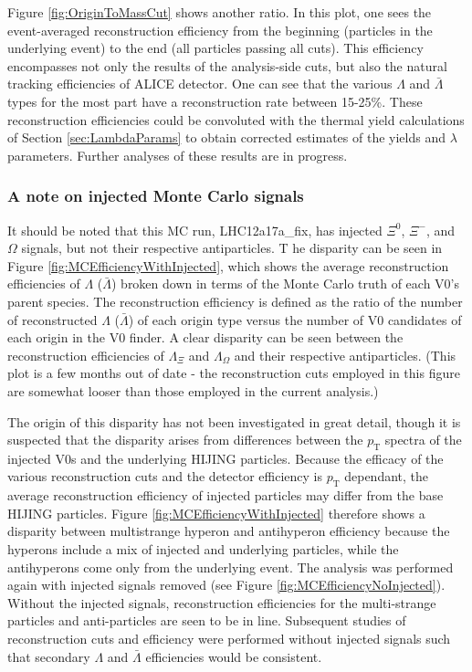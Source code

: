 Figure \ref{fig:OriginToMassCut} shows another ratio.  
In this plot, one sees the event-averaged reconstruction efficiency from the beginning (particles in the underlying event) to the end (all particles passing all cuts).  
This efficiency encompasses not only the results of the analysis-side cuts, but also the natural tracking efficiencies of ALICE detector.  
One can see that the various $\Lambda$ and $\bar{\Lambda}$ types for the most part have a reconstruction rate between 15-25\%.  
These reconstruction efficiencies could be convoluted with the thermal yield calculations of Section \ref{sec:LambdaParams} to obtain corrected estimates of the yields and $\lambda$ parameters.  
Further analyses of these results are in progress.

\subsubsection{A note on injected Monte Carlo signals}
\label{sec:InjectedMCSignals}

It should be noted that this MC run, LHC12a17a\_fix, has injected $\Xi^0$, $\Xi^-$, and $\Omega$ signals, but not their respective antiparticles.  T
he disparity can be seen in Figure \ref{fig:MCEfficiencyWithInjected}, which shows the average reconstruction efficiencies of $\Lambda$ ($\bar{\Lambda}$) broken down in terms of the Monte Carlo truth of each V0's parent species. 
The reconstruction efficiency is defined as the ratio of the number of reconstructed $\Lambda$ ($\bar{\Lambda}$) of each origin type versus the number of V0 candidates of each origin in the V0 finder.  
A clear disparity can be seen between the reconstruction efficiencies of $\Lambda_{\Xi}$ and $\Lambda_{\Omega}$ and their respective antiparticles.  
(This plot is a few months out of date - the reconstruction cuts employed in this figure are somewhat looser than those employed in the current analysis.)

The origin of this disparity has not been investigated in great detail, though it is suspected that the disparity arises from differences between the $p_\mathrm{T}$ spectra of the injected V0s and the underlying HIJING particles.  
Because the efficacy of the various reconstruction cuts and the detector efficiency is $p_\mathrm{T}$ dependant, the average reconstruction efficiency of injected particles may differ from the base HIJING particles.  
Figure \ref{fig:MCEfficiencyWithInjected} therefore shows a disparity between multistrange hyperon and antihyperon efficiency because the hyperons include a mix of injected and underlying particles, while the antihyperons come only from the underlying event. 
The analysis was performed again with injected signals removed (see Figure \ref{fig:MCEfficiencyNoInjected}).  
Without the injected signals, reconstruction efficiencies for the multi-strange particles and anti-particles are seen to be in line.  
Subsequent studies of reconstruction cuts and efficiency were performed without injected signals such that secondary $\Lambda$ and $\bar{\Lambda}$ efficiencies would be consistent.

